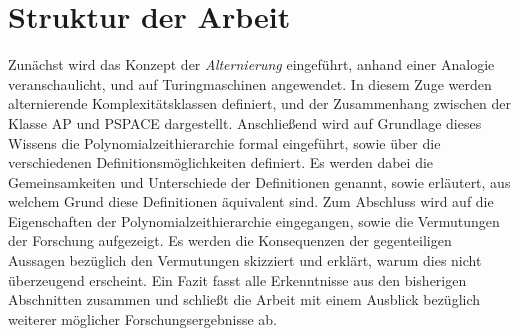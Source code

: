 \section{Struktur der Arbeit}
Zunächst wird das Konzept der \emph{Alternierung} eingeführt, anhand einer Analogie veranschaulicht, und auf Turingmaschinen angewendet. In diesem Zuge werden alternierende Komplexitätsklassen definiert, und der Zusammenhang 
zwischen der Klasse AP und PSPACE dargestellt. Anschließend wird auf Grundlage dieses Wissens die Polynomialzeithierarchie formal eingeführt, sowie über die verschiedenen Definitionsmöglichkeiten definiert.
Es werden dabei die Gemeinsamkeiten und Unterschiede der Definitionen genannt, sowie erläutert, aus welchem Grund diese Definitionen äquivalent sind.
Zum Abschluss wird auf die Eigenschaften der Polynomialzeithierarchie eingegangen, sowie die Vermutungen der Forschung aufgezeigt. 
Es werden die Konsequenzen der gegenteiligen Aussagen bezüglich den Vermutungen skizziert und erklärt, warum dies nicht überzeugend erscheint.
Ein Fazit fasst alle Erkenntnisse aus den bisherigen Abschnitten zusammen und schließt die Arbeit mit einem Ausblick bezüglich weiterer möglicher Forschungsergebnisse ab.





